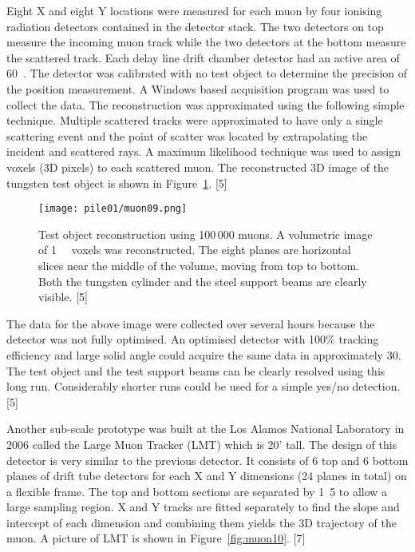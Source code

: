 \documentclass[twocolumn,a4paper]{article}
\begin{document}
Eight X and eight Y locations were measured for each muon by four
ionising radiation detectors contained in the detector stack. The two
detectors on top measure the incoming muon track while the two
detectors at the bottom measure the scattered track. Each delay line
drift chamber detector had an active area of
\unit{60}{\square{\centi\metre}}. The detector was calibrated
with no test object to determine the precision of the position
measurement. A Windows based acquisition program was used to collect
the data. The reconstruction was approximated using the following
simple technique. Multiple scattered tracks were approximated to have
only a single scattering event and the point of scatter was located by
extrapolating the incident and scattered rays. A maximum likelihood
technique was used to assign voxels (3D pixels) to each scattered
muon. The reconstructed 3D image of the tungsten test object is shown
in Figure~\ref{fig:muon09}. [5]

\begin{figure}
  \texttt{[image: pile01/muon09.png]}
  \caption{Test object reconstruction using 100\,000 muons. A
    volumetric image of \unit{1}{\cubic{\centi\metre}}
    voxels was reconstructed. The eight planes are horizontal slices
    near the middle of the volume, moving from top to bottom. Both the
    tungsten cylinder and the steel support beams are clearly
    visible. [5]}
  \label{fig:muon09}
\end{figure}

The data for the above image were collected over several hours because
the detector was not fully optimised. An optimised detector with 100\%
tracking efficiency and large solid angle could acquire the same data
in approximately \unit{30}{\minute}. The test object and the test
support beams can be clearly resolved using this long
run. Considerably shorter runs could be used for a simple yes/no
detection. [5]

Another sub-scale prototype was built at the Los Alamos National
Laboratory in 2006 called the Large Muon Tracker (LMT) which is 20'
tall. The design of this detector is very similar to the previous
detector. It consists of 6 top and 6 bottom planes of drift tube
detectors for each X and Y dimensions (24 planes in total) on a
flexible frame. The top and bottom sections are separated by
\unit{1.5}{\metre} to allow a large sampling region. X and Y tracks
are fitted separately to find the slope and intercept of each
dimension and combining them yields the 3D trajectory of the muon. A
picture of LMT is shown in Figure~\ref{fig:muon10}. [7]
\end{document}
